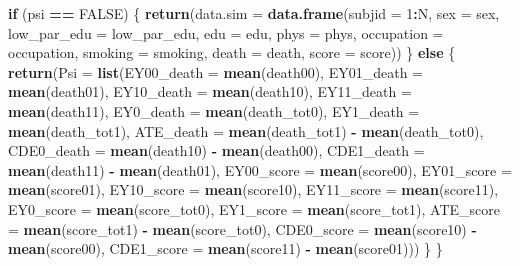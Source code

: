 \documentclass[
]{book}
\newenvironment{Shaded}{\begin{snugshade}}{\end{snugshade}}
\newcommand{\AttributeTok}[1]{\textcolor[rgb]{0.13,0.29,0.53}{#1}}
\newcommand{\ConstantTok}[1]{\textcolor[rgb]{0.56,0.35,0.01}{#1}}
\newcommand{\ControlFlowTok}[1]{\textcolor[rgb]{0.13,0.29,0.53}{\textbf{#1}}}
\newcommand{\DecValTok}[1]{\textcolor[rgb]{0.00,0.00,0.81}{#1}}
\newcommand{\FunctionTok}[1]{\textcolor[rgb]{0.13,0.29,0.53}{\textbf{#1}}}
\newcommand{\NormalTok}[1]{#1}
\newcommand{\SpecialCharTok}[1]{\textcolor[rgb]{0.81,0.36,0.00}{\textbf{#1}}}
\begin{document}
\begin{Shaded}
\begin{Highlighting}[]
  
  \ControlFlowTok{if}\NormalTok{ (psi }\SpecialCharTok{==} \ConstantTok{FALSE}\NormalTok{) \{}
    \FunctionTok{return}\NormalTok{(}\AttributeTok{data.sim =} \FunctionTok{data.frame}\NormalTok{(}\AttributeTok{subjid =} \DecValTok{1}\SpecialCharTok{:}\NormalTok{N,}
                                 \AttributeTok{sex =}\NormalTok{ sex, }
                                 \AttributeTok{low\_par\_edu =}\NormalTok{ low\_par\_edu,}
                                 \AttributeTok{edu =}\NormalTok{ edu,}
                                 \AttributeTok{phys =}\NormalTok{ phys,}
                                 \AttributeTok{occupation =}\NormalTok{ occupation,}
                                 \AttributeTok{smoking =}\NormalTok{ smoking,}
                                 \AttributeTok{death =}\NormalTok{ death,}
                                 \AttributeTok{score =}\NormalTok{ score))}
\NormalTok{  \} }\ControlFlowTok{else}\NormalTok{ \{}
    \FunctionTok{return}\NormalTok{(}\AttributeTok{Psi =} \FunctionTok{list}\NormalTok{(}\AttributeTok{EY00\_death =} \FunctionTok{mean}\NormalTok{(death00),}
                      \AttributeTok{EY01\_death =} \FunctionTok{mean}\NormalTok{(death01),}
                      \AttributeTok{EY10\_death =} \FunctionTok{mean}\NormalTok{(death10),}
                      \AttributeTok{EY11\_death =} \FunctionTok{mean}\NormalTok{(death11),}
                      \AttributeTok{EY0\_death =} \FunctionTok{mean}\NormalTok{(death\_tot0), }
                      \AttributeTok{EY1\_death =} \FunctionTok{mean}\NormalTok{(death\_tot1),}
                      \AttributeTok{ATE\_death =} \FunctionTok{mean}\NormalTok{(death\_tot1) }\SpecialCharTok{{-}} \FunctionTok{mean}\NormalTok{(death\_tot0),}
                      \AttributeTok{CDE0\_death =} \FunctionTok{mean}\NormalTok{(death10) }\SpecialCharTok{{-}} \FunctionTok{mean}\NormalTok{(death00),}
                      \AttributeTok{CDE1\_death =} \FunctionTok{mean}\NormalTok{(death11) }\SpecialCharTok{{-}} \FunctionTok{mean}\NormalTok{(death01),}
                      \AttributeTok{EY00\_score =} \FunctionTok{mean}\NormalTok{(score00),}
                      \AttributeTok{EY01\_score =} \FunctionTok{mean}\NormalTok{(score01),}
                      \AttributeTok{EY10\_score =} \FunctionTok{mean}\NormalTok{(score10),}
                      \AttributeTok{EY11\_score =} \FunctionTok{mean}\NormalTok{(score11),}
                      \AttributeTok{EY0\_score =} \FunctionTok{mean}\NormalTok{(score\_tot0),}
                      \AttributeTok{EY1\_score =} \FunctionTok{mean}\NormalTok{(score\_tot1),}
                      \AttributeTok{ATE\_score =} \FunctionTok{mean}\NormalTok{(score\_tot1) }\SpecialCharTok{{-}} \FunctionTok{mean}\NormalTok{(score\_tot0),}
                      \AttributeTok{CDE0\_score =} \FunctionTok{mean}\NormalTok{(score10) }\SpecialCharTok{{-}} \FunctionTok{mean}\NormalTok{(score00),}
                      \AttributeTok{CDE1\_score =} \FunctionTok{mean}\NormalTok{(score11) }\SpecialCharTok{{-}} \FunctionTok{mean}\NormalTok{(score01)))}
\NormalTok{  \}}
\NormalTok{\}}



\end{Highlighting}
\end{Shaded}
\end{document}
